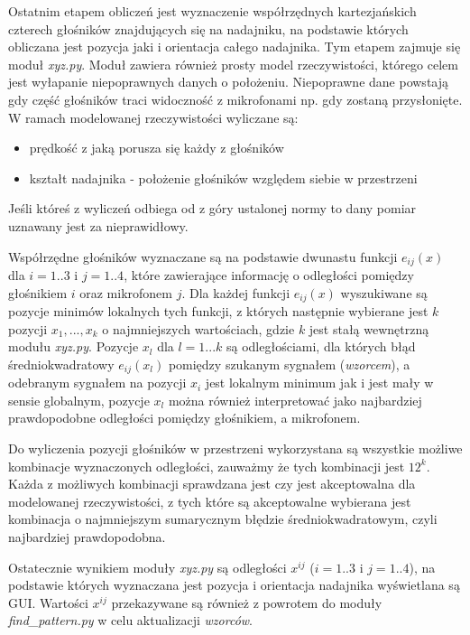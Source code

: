 Ostatnim etapem obliczeń jest wyznaczenie współrzędnych kartezjańskich czterech głośników znajdujących się na nadajniku,
na podstawie których obliczana jest pozycja jaki i orientacja całego nadajnika.
Tym etapem zajmuje się moduł \textit{xyz.py}. Moduł zawiera również prosty model rzeczywistości,
którego celem jest wyłapanie niepoprawnych danych o położeniu.
Niepoprawne dane powstają gdy część głośników traci widoczność z mikrofonami np. gdy zostaną przysłonięte.
W ramach modelowanej rzeczywistości wyliczane są:
\begin{itemize}
  \item prędkość z jaką porusza się każdy z głośników
  \item kształt nadajnika - położenie głośników względem siebie w przestrzeni
\end{itemize}
Jeśli któreś z wyliczeń odbiega od z góry ustalonej normy to dany pomiar uznawany jest za nieprawidłowy.


Współrzędne głośników wyznaczane są na podstawie dwunastu funkcji $e_{ij}(x)$ dla $i=1..3$ i $j=1..4$, które zawierające informację o odległości
pomiędzy głośnikiem $i$ oraz mikrofonem $j$.
Dla każdej funkcji $e_{ij}(x)$ wyszukiwane są pozycje minimów lokalnych tych funkcji, z których następnie wybierane jest $k$ pozycji $x_1, ..., x_k$
o najmniejszych wartościach, gdzie $k$ jest stałą wewnętrzną modułu \textit{xyz.py}.
Pozycje $x_l$ dla $l=1...k$ są odległościami, dla których błąd średniokwadratowy $e_{ij}(x_l)$ pomiędzy szukanym sygnałem (\textit{wzorcem}), a odebranym sygnałem na pozycji $x_i$
jest lokalnym minimum jak i jest mały w sensie globalnym,
pozycje $x_l$ można również  interpretować jako najbardziej prawdopodobne odległości pomiędzy głośnikiem, a mikrofonem.

Do wyliczenia pozycji głośników w przestrzeni wykorzystana są wszystkie możliwe kombinacje wyznaczonych odległości,
zauważmy że tych kombinacji jest $12^k$. Każda z możliwych kombinacji 
sprawdzana jest czy jest akceptowalna dla modelowanej rzeczywistości, z tych które są akceptowalne wybierana jest 
kombinacja o najmniejszym sumarycznym błędzie średniokwadratowym, czyli najbardziej prawdopodobna.

Ostatecznie wynikiem  moduły \textit{xyz.py} są odległości $x^{ij}$  ($i=1..3$ i $j=1..4$), na podstawie których
wyznaczana jest pozycja i orientacja nadajnika wyświetlana są GUI.
Wartości $x^{ij}$ przekazywane są również z powrotem do moduły \textit{find\_pattern.py} w celu aktualizacji \textit{wzorców}.


